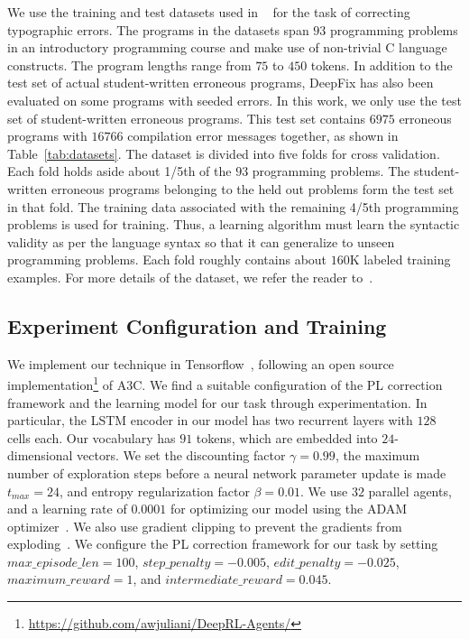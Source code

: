 \documentclass{article}
\begin{document}
We use the training and test datasets used in ~\cite{gupta2017deepfix} for the task of correcting typographic errors.
The programs in the datasets span $93$ programming problems in an introductory programming course and make use of non-trivial C language constructs.
The program lengths  range from $ 75 $ to $ 450 $ tokens.
In addition to the test set of actual student-written erroneous programs,
DeepFix has also been evaluated on some programs with seeded errors.
In this work, we only use the test set of student-written erroneous programs.
This test set contains $6975$ erroneous programs with
$16766$ compilation error messages together, as shown in Table~\ref{tab:datasets}.
The dataset is divided into five folds for cross validation.
Each fold holds aside about 1/5th of the $ 93 $ programming problems.
The student-written erroneous programs belonging to the held out problems
form the test set in that fold.
The training data associated with the remaining 4/5th programming problems is used for training.
Thus, a learning algorithm must learn the syntactic validity as per the language syntax so that it can generalize to unseen programming problems.
Each fold roughly contains about $160$K labeled training examples. 
For more details of the dataset, we refer the reader to~\cite{gupta2017deepfix}.

\subsection{Experiment Configuration and Training}
We implement our technique in Tensorflow~\cite{abadi2016tensorflow}, following an open source implementation\footnote{\small{\url{https://github.com/awjuliani/DeepRL-Agents/}}} of A3C.
We find a suitable configuration of the PL correction framework and the learning model for our task through experimentation.
In particular, the LSTM encoder in our model has two recurrent layers with $ 128 $ cells each. Our vocabulary has $ 91 $ tokens, which are embedded into $ 24 $-dimensional vectors.
We set the discounting factor $ \gamma = 0.99 $, the maximum number of exploration steps before a neural network parameter update is made $ t_{max} = 24 $, and entropy regularization factor $ \beta = 0.01 $. 
We use $ 32 $ parallel agents, and a learning rate of $ 0.0001 $ for optimizing our model using the ADAM optimizer~\cite{kingma2015adam}.
We also use gradient clipping to prevent the gradients from exploding~\cite{pascanu2013difficulty}.
We configure the PL correction framework for our task by setting $ max\_episode\_len = 100 $, $ step\_penalty = -0.005 $, $ edit\_penalty = -0.025 $, $ maximum\_reward = 1 $, and $ intermediate\_reward = 0.045 $.
\end{document}
